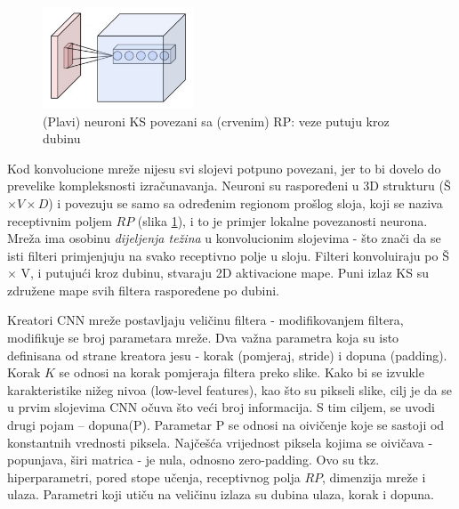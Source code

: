 \documentclass[12pt]{report}
\numberwithin{equation}{section}
\begin{document}
   \begin{figure}
\vspace{-20pt}  
  \begin{center}
    \includegraphics[width=0.4\textwidth]{SLIKE/receptive}
  \end{center}
  \caption{(Plavi) neuroni KS povezani sa (crvenim) RP: veze putuju kroz dubinu}
  \label{fig:rfield}
\end{figure}


  Kod konvolucione mreže nijesu svi slojevi potpuno povezani, jer to bi dovelo do prevelike kompleksnosti izračunavanja. Neuroni su raspoređeni u 3D strukturu (Š $\times V \times D$) i povezuju se samo sa određenim regionom prošlog sloja, koji se naziva receptivnim poljem $RP$ (slika \ref{fig:rfield}), i to je primjer lokalne povezanosti neurona. Mreža ima osobinu \textit{dijeljenja težina} u konvolucionim slojevima - što znači da se isti filteri primjenjuju na svako receptivno polje u sloju. Filteri konvoluiraju po Š $\times$ V, i putujući kroz dubinu, stvaraju 2D aktivacione mape. Puni izlaz KS su združene mape svih filtera raspoređene po dubini. 

  Kreatori CNN mreže postavljaju veličinu filtera - modifikovanjem filtera, modifikuje se broj parametara mreže. Dva važna parametra koja su isto definisana od strane kreatora jesu - korak (pomjeraj, stride) i dopuna (padding). Korak $K$ se odnosi na  korak pomjeraja filtera  preko  slike. Kako  bi  se izvukle  karakteristike  nižeg  nivoa (low-level  features), kao što su pikseli slike,  cilj  je  da  se  u  prvim  slojevima  CNN očuva što veći broj informacija. S tim ciljem, se uvodi  drugi pojam – dopuna(P). Parametar P se odnosi na oivičenje koje se sastoji od konstantnih vrednosti piksela. Najčešća vrijednost piksela  kojima  se  oivičava - popunjava, širi matrica - je  nula, odnosno zero-padding. Ovo su tkz. hiperparametri, pored stope učenja, receptivnog polja $RP$, dimenzija mreže i ulaza. Parametri koji utiču na veličinu izlaza su dubina ulaza, korak i dopuna. 
  
\end{document}
